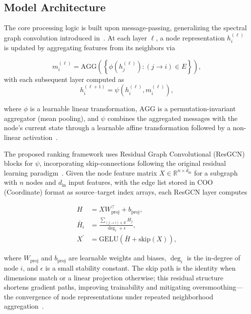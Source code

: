 \documentclass[english]{sbrt}
\begin{document}
\subsection{Model Architecture}

The core processing logic is built upon message-passing, generalizing the
spectral graph convolution introduced in~\cite{kipf2017semi}. At each layer
$\ell$, a node representation $h_i^{(\ell)}$ is updated by aggregating features
from its neighbors via

\begin{equation}
  m_i^{(\ell)} = \mathrm{AGG}
  \left(\left\{
      \phi\left(h_j^{(\ell)}\right):(j\rightarrow i) \in E
  \right\}\right),
\end{equation}
with each subsequent layer computed as
\begin{equation}
  h_i^{(\ell+1)} = \psi\left(h_i^{(\ell)},m_i^{(\ell)}\right),
\end{equation}

\noindent
where $\phi$ is a learnable linear transformation, $\mathrm{AGG}$ is a
permutation-invariant aggregator (mean pooling), and $\psi$ combines the
aggregated messages with the node's current state through a learnable affine
transformation followed by a non-linear activation~\cite{amara2025multiview}.

The proposed ranking framework uses Residual Graph Convolutional (ResGCN) blocks
for $\psi$, incorporating skip-connections following the original residual
learning paradigm~\cite{he2016deep,scholkemper2025residual}. Given the node
feature matrix $X \in \mathbb{R}^{n \times d_{\text{in}}}$ for a subgraph with
$n$ nodes and $d_{\text{in}}$ input features, with the edge list stored in COO
(Coordinate) format as source--target index arrays, each ResGCN layer computes

\begin{equation}
  \begin{aligned}
    H         & = X W_{\mathrm{proj}}^\top + b_{\mathrm{proj}},           \\
    \bar{H}_i & = \frac{\sum_{(j \to i) \in E} H_j}{\deg_i + \epsilon},   \\
    X^\prime  & = \mathrm{GELU}\!\left(\bar{H} + \mathrm{skip}(X)\right),
  \end{aligned}
\end{equation}

\noindent
where $W_{\mathrm{proj}}$ and $b_{\mathrm{proj}}$ are learnable weights and
biases, $\deg_i$ is the in-degree of node $i$, and $\epsilon$ is a small stability
constant. The skip path is the identity when dimensions match or a linear
projection otherwise; this residual structure shortens gradient paths, improving
trainability and mitigating oversmoothing---the convergence of node
representations under repeated neighborhood
aggregation~\cite{scholkemper2025residual,akansha2025oversquashing}.
\end{document}
